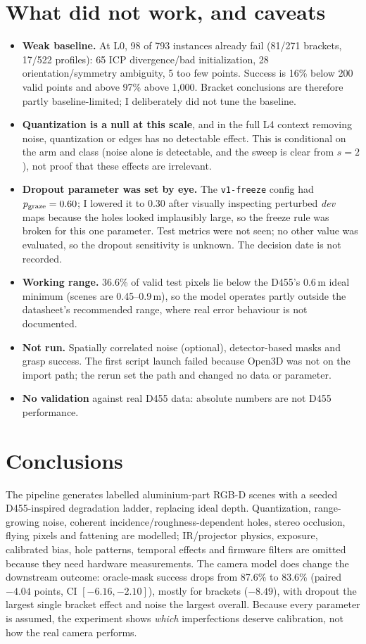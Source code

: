 \documentclass[10pt]{article}
\begin{document}
\section{What did not work, and caveats}
\begin{itemize}
\setlength{\itemsep}{0pt}
\item \textbf{Weak baseline.} At L0, 98 of 793 instances already fail (81/271 brackets, 17/522 profiles): 65 ICP divergence/bad initialization, 28 orientation/symmetry ambiguity, 5 too few points. Success is 16\% below 200 valid points and above 97\% above 1,000. Bracket conclusions are therefore partly baseline-limited; I deliberately did not tune the baseline.
\item \textbf{Quantization is a null at this scale}, and in the full L4 context removing noise, quantization or edges has no detectable effect. This is conditional on the arm and class (noise alone is detectable, and the sweep is clear from $s=2$), not proof that these effects are irrelevant.
\item \textbf{Dropout parameter was set by eye.} The \texttt{v1-freeze} config had $p_{\rm graze}=0.60$; I lowered it to 0.30 after visually inspecting perturbed \emph{dev} maps because the holes looked implausibly large, so the freeze rule was broken for this one parameter. Test metrics were not seen; no other value was evaluated, so the dropout sensitivity is unknown. The decision date is not recorded.
\item \textbf{Working range.} 36.6\% of valid test pixels lie below the D455's 0.6\,m ideal minimum (scenes are 0.45--0.9\,m), so the model operates partly outside the datasheet's recommended range, where real error behaviour is not documented.
\item \textbf{Not run.} Spatially correlated noise (optional), detector-based masks and grasp success. The first script launch failed because Open3D was not on the import path; the rerun set the path and changed no data or parameter.
\item \textbf{No validation} against real D455 data: absolute numbers are not D455 performance.
\end{itemize}

\section{Conclusions}
The pipeline generates labelled aluminium-part RGB-D scenes with a seeded D455-inspired degradation ladder, replacing ideal depth. Quantization, range-growing noise, coherent incidence/roughness-dependent holes, stereo occlusion, flying pixels and fattening are modelled; IR/projector physics, exposure, calibrated bias, hole patterns, temporal effects and firmware filters are omitted because they need hardware measurements. The camera model does change the downstream outcome: oracle-mask success drops from 87.6\% to 83.6\% (paired $-4.04$ points, CI $[-6.16,-2.10]$), mostly for brackets ($-8.49$), with dropout the largest single bracket effect and noise the largest overall. Because every parameter is assumed, the experiment shows \emph{which} imperfections deserve calibration, not how the real camera performs.
\end{document}
